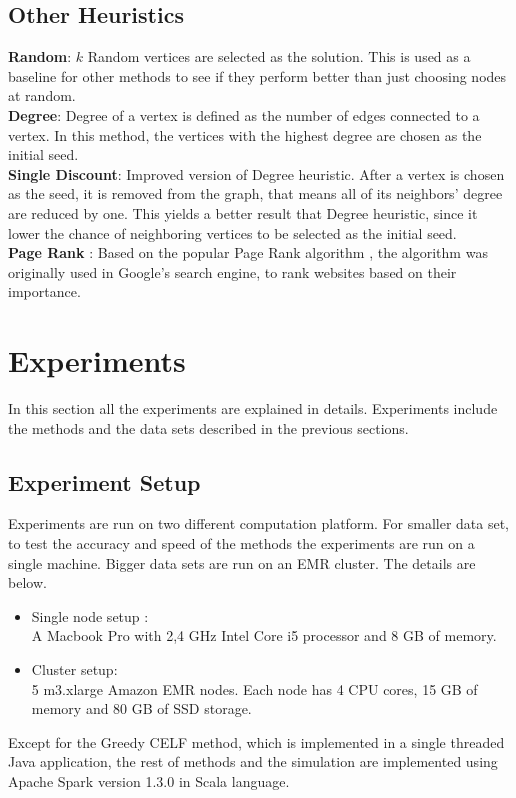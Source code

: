 \documentclass[english]{tktltiki}
\begin{document}
\subsection{Other Heuristics}
\textbf{Random}: $k$ Random vertices are selected as the solution. This is used as a baseline for other methods to see if they perform better than just choosing nodes at random. \\
\textbf{Degree}: Degree of a vertex is defined as the number of edges connected to a vertex. In this method, the vertices with the highest degree are chosen as the initial seed. \\ 
\textbf{Single Discount}: Improved version of Degree heuristic. After a vertex is chosen as the seed, it is removed from the graph, that means all of its neighbors' degree are reduced by one. This yields a better result that Degree heuristic, since it lower the chance of neighboring vertices to be selected as the initial seed. \\ 
\textbf {Page Rank} : Based on the popular Page Rank algorithm \cite{page99}, the algorithm was originally used in Google's search engine, to rank websites based on their importance. 

\newpage


\section{Experiments} \label{sec:experiments}
In this section all the experiments are explained in details. Experiments include the methods and the data sets described in the previous sections. 
\subsection{Experiment Setup}
Experiments are run on two different computation platform. For smaller data set, to test the accuracy and speed of the methods the experiments are run on a single machine. Bigger data sets are run on an EMR cluster. The details are below. 

\begin{itemize}
\item Single node setup : \\
A Macbook Pro with 2,4 GHz Intel Core i5 processor and 8 GB of memory. 
\item Cluster setup: \\
5 m3.xlarge Amazon EMR nodes. Each node has 4 CPU cores, 15 GB of memory and 80 GB of SSD storage.
\end{itemize}
Except for the Greedy CELF method, which is implemented in a single threaded Java application, the rest of methods and the simulation are implemented using Apache Spark version 1.3.0 in Scala language. 
\end{document}
